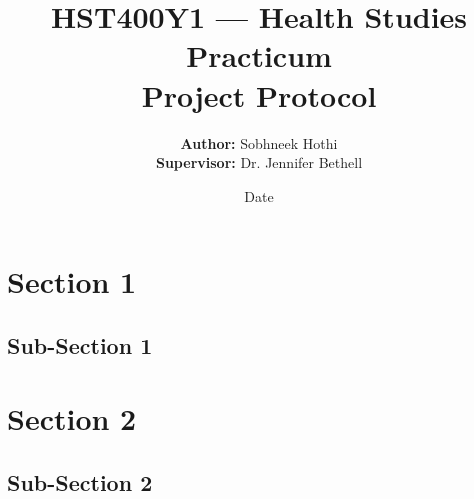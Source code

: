 \documentclass[letterpaper,12pt]{article}
\begin{document}
\title{HST400Y1 — Health Studies Practicum \\\textbf{Project Protocol}}
\author{\textbf{Author:} Sobhneek Hothi \\
\textbf{Supervisor:} Dr. Jennifer Bethell}
\date{Date}
\maketitle
\tableofcontents
\newpage

\section{Section 1}

\subsection{Sub-Section 1}

\section{Section 2}

\subsection{Sub-Section 2}
\end{document}

